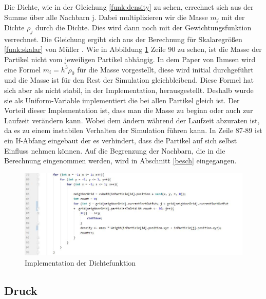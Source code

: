 \documentclass[intern,palatino]{cgBA}
\begin{document}
Die Dichte, wie in der Gleichung \ref{funk:density} zu sehen, errechnet sich aus der Summe über alle Nachbarn j. Dabei multiplizieren wir die Masse $m_j$ mit der Dichte $\rho_j$ durch die Dichte. Dies wird dann noch mit der Gewichtungsfunktion verrechnet. Die Gleichung ergibt sich aus der Berechnung für Skalaregrößen \ref{funk:skalar} von Müller \cite{muller2003particle}.
\newline\newline
Wie in Abbildung \ref{img:dichte} Zeile 90 zu sehen, ist die Masse der Partikel nicht vom jeweiligen Partikel abhängig. In dem Paper von Ihmsen \cite{ihmsen2014sph} wird eine Formel $m_i = h^3 \rho_0$ für die Masse vorgestellt, diese wird initial durchgeführt und die Masse ist für den Rest der Simulation gleichbleibend. Diese Formel hat sich aber als nicht stabil, in der Implementation, herausgestellt. Deshalb wurde sie als Uniform-Variable implementiert die bei allen Partikel gleich ist. Der Vorteil dieser Implementation ist, dass man die Masse zu beginn oder auch zur Laufzeit verändern kann. Wobei dem ändern während der Laufzeit abzuraten ist, da es zu einem instabilen Verhalten der Simulation führen kann.
\newline
In Zeile 87-89 ist ein If-Abfang eingebaut der es verhindert, dass die Partikel auf sich selbst Einfluss nehmen können. Auf die Begrenzung der Nachbarn, die in die Berechnung eingenommen werden, wird in Abschnitt \ref{besch} eingegangen.
\begin{figure}[H]
	\centering
	\includegraphics[width=1.35\columnwidth]{Bilder/dichte.jpg}
	\caption{Implementation der Dichtefunktion}
	\label{img:dichte}
\end{figure}


\subsection{Druck}\label{druch}
\end{document}
